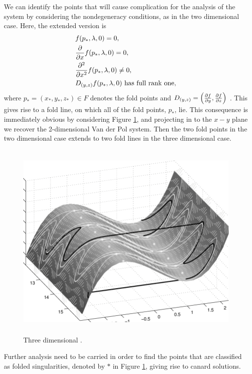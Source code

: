 We can identify the points that will cause complication for the analysis of the system by considering the nondegeneracy conditions, as in the two dimensional case. Here, the extended version is
\begin{equation}
\begin{aligned}
&f(p_*,\lambda,0)=0,\\
&\pd{}{x}f(p_*,\lambda,0)=0,\\
&\pd{^2}{x^2}f(p_*,\lambda,0)\neq 0,\\
&D_{(y,z)}f(p_*,\lambda,0) \ \text{has full rank one},
\end{aligned}
\label{eq: non-degeneracy 3d system}
\end{equation}
where $ p_*=(x_*,y_*,z_*)\in F $  denotes the fold points and $ D_{(y,z)}=\left(\pd{f}{y},\pd{f}{z}\right) $  \citep{MMO}.
This gives rise to a fold line, on which all of the fold points, $p_*$, lie.
This consequence is immediately obvious by considering Figure \ref{fig: 3d folded singularity}, and projecting in to the $x-y$ plane we recover the 2-dimensional Van der Pol system. Then the two fold points in the two dimensional case extends to two fold lines in the three dimensional case.
\begin{figure}[h!]\centering
	\includegraphics[height=10cm,width=14cm]{Images/Three-dimensional-plot-of-a-trajectory-for-the-van-der-Pol-equation-and-the-critical}
	\caption{Three dimensional \vdp \citep{3D-VdP}.}
	\label{fig: 3d folded singularity}
\end{figure}
Further analysis need to be carried in order to find the points that are classified as folded singularities, denoted by $*$ in Figure \ref{fig: 3d folded singularity}, giving rise to canard solutions.
